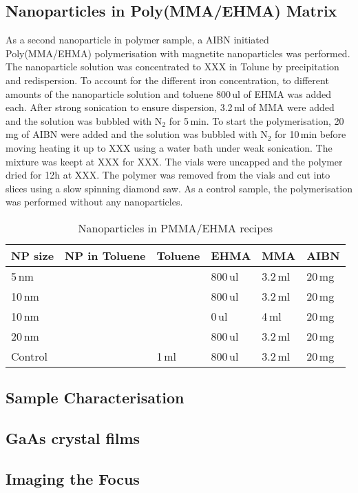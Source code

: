 \subsection{Nanoparticles in Poly(MMA/EHMA)  Matrix}
As a second nanoparticle in polymer sample, a AIBN initiated Poly(MMA/EHMA) polymerisation with magnetite nanoparticles was performed. 
The nanoparticle solution was concentrated to XXX in Tolune by precipitation and redispersion. To account for the different iron concentration, to different amounts of the nanoparticle solution and toluene 800\,ul of EHMA was added each. After strong sonication to ensure dispersion, 3.2\,ml of MMA were added and the solution was bubbled with N$_2$ for 5\,min. To start the polymerisation, 20\,mg of AIBN were added and the solution was bubbled with N$_2$  for 10\,min before moving heating it up to XXX using a water bath under weak sonication. The mixture was keept at XXX for XXX.
The vials were uncapped and the polymer dried for 12h at XXX. The polymer was removed from the vials and cut into slices using a slow spinning diamond saw.
As a control sample, the polymerisation was performed without any nanoparticles. 

\begin{table}
	\centering
	\caption{Nanoparticles in PMMA/EHMA recipes}
	\label{tab:samplePS}
	\begin{tabular}{llllll}
		\hline
		NP size &NP in Toluene&Toluene & EHMA & MMA & AIBN \\
		\hline
		5\,nm& & &800\,ul&  3.2\,ml&   20\,mg    \\
		10\,nm& & &800\,ul&  3.2\,ml&   20\,mg    \\
		10\,nm& & &0\,ul&  4\,ml&   20\,mg    \\
		20\,nm& & &800\,ul&  3.2\,ml&   20\,mg    \\
			Control& & 1\,ml&800\,ul&  3.2\,ml&   20\,mg    \\
		\hline
	\end{tabular}
\end{table}

\subsection{Sample Characterisation}
\subsection{GaAs crystal films}


\subsection{Imaging the Focus}
